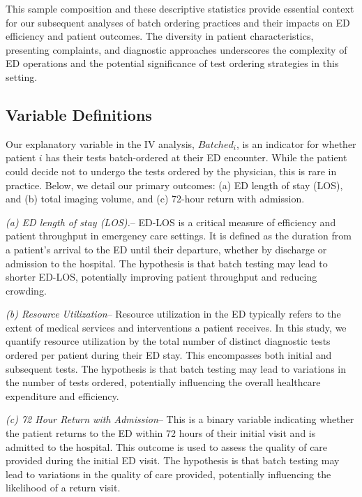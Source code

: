 \documentclass[,,nonblindrev]{informs}
\begin{document}
This sample composition and these descriptive statistics provide
essential context for our subsequent analyses of batch ordering
practices and their impacts on ED efficiency and patient outcomes. The
diversity in patient characteristics, presenting complaints, and
diagnostic approaches underscores the complexity of ED operations and
the potential significance of test ordering strategies in this setting.

\hypertarget{variable-definitions}{%
\subsection{Variable Definitions}\label{variable-definitions}}

Our explanatory variable in the IV analysis, \(Batched_i\), is an
indicator for whether patient \(i\) has their tests batch-ordered at
their ED encounter. While the patient could decide not to undergo the
tests ordered by the physician, this is rare in practice. Below, we
detail our primary outcomes: (a) ED length of stay (LOS), and (b) total
imaging volume, and (c) 72-hour return with admission.

\emph{(a) ED length of stay (LOS).}-- ED-LOS is a critical measure of
efficiency and patient throughput in emergency care settings. It is
defined as the duration from a patient's arrival to the ED until their
departure, whether by discharge or admission to the hospital. The
hypothesis is that batch testing may lead to shorter ED-LOS, potentially
improving patient throughput and reducing crowding.

\emph{(b) Resource Utilization}-- Resource utilization in the ED
typically refers to the extent of medical services and interventions a
patient receives. In this study, we quantify resource utilization by the
total number of distinct diagnostic tests ordered per patient during
their ED stay. This encompasses both initial and subsequent tests. The
hypothesis is that batch testing may lead to variations in the number of
tests ordered, potentially influencing the overall healthcare
expenditure and efficiency.

\emph{(c) 72 Hour Return with Admission}-- This is a binary variable
indicating whether the patient returns to the ED within 72 hours of
their initial visit and is admitted to the hospital. This outcome is
used to assess the quality of care provided during the initial ED visit.
The hypothesis is that batch testing may lead to variations in the
quality of care provided, potentially influencing the likelihood of a
return visit.
\end{document}
